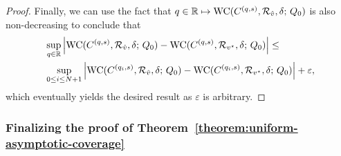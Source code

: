 \begin{proof}
Finally,  we can use the fact that $q \in \mathbb{R}  \mapsto \textup{WC}( C^{(q,s)}, \mathcal{R}_{\hat{v}}, \delta; \, Q_0)$ is also non-decreasing to conclude that
\begin{align*}
&\sup_{q \in \mathbb{R}} \left| \textup{WC}( C^{(q,s)}, \mathcal{R}_{\hat{v}}, \delta; \, Q_0)
- \textup{WC}( C^{(q,s)}, \mathcal{R}_{v^\star}, \delta; \, Q_0) \right|
\le
\\
 & \sup_{0\le i \le N+1} \left|  \textup{WC}( C^{(q_{i},s)}, \mathcal{R}_{\hat{v}}, \delta; \, Q_0) -  \textup{WC}( C^{(q_i,s)}, \mathcal{R}_{v^\star}, \delta; \, Q_0) \right| + \varepsilon,
\end{align*} 
which eventually yields the desired result as $\varepsilon$ is arbitrary.
\end{proof}

\subsubsection{Finalizing the proof of
  Theorem~\ref{theorem:uniform-asymptotic-coverage}}
\label{sec:finalize-uniform-proof}

